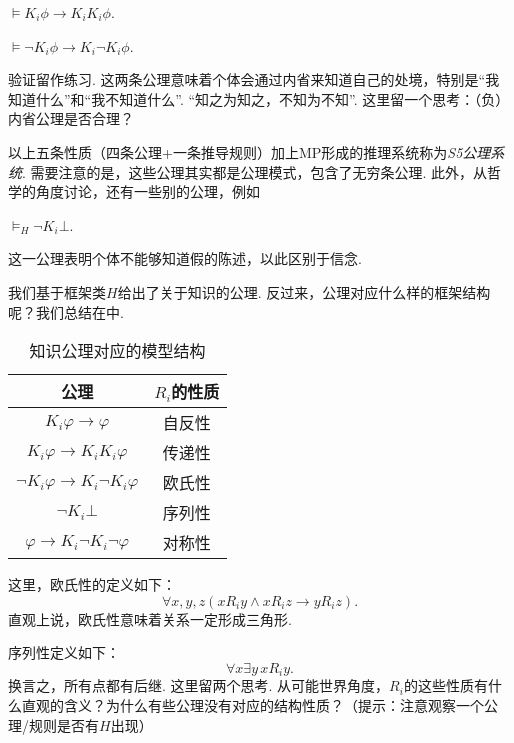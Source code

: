 \begin{axiom}[正内省公理]
    $\vDash K_i\phi\to K_iK_i\phi$.
\end{axiom}

\begin{axiom}[负内省公理]
    $\vDash \neg K_i\phi\to K_i\neg K_i\phi$.
\end{axiom}

验证留作练习.  这两条公理意味着个体会通过内省来知道自己的处境，特别是“我知道什么”和“我不知道什么”. “知之为知之，不知为不知”. 这里留一个思考：（负）内省公理是否合理？

以上五条性质（四条公理+一条推导规则）加上MP形成的推理系统称为\emph{S5公理系统}. 需要注意的是，这些公理其实都是公理模式，包含了无穷条公理. 此外，从哲学的角度讨论，还有一些别的公理，例如
\begin{axiom}[一致性公理]
    $\vDash_H\neg K_i\bot$.
\end{axiom}
这一公理表明个体不能够知道假的陈述，以此区别于信念.

我们基于框架类$H$给出了关于知识的公理. 反过来，公理对应什么样的框架结构呢？我们总结在中.
    \begin{table}[ht]
        \centering
       \begin{tabular}{cc}
\toprule 公理 &  $R_i$的性质 \\
\midrule $K_i \varphi \to \varphi$ & 自反性 \\
$K_i \varphi \to K_i K_i \varphi$ & 传递性 \\
$\neg K_i \varphi \to K_i \neg K_i \varphi$ & 欧氏性 \\
$\neg K_i\bot$  & 序列性\\
$\varphi \to K_i \neg K_i \neg \varphi$ & 对称性 \\
\bottomrule
\end{tabular}
        \caption{知识公理对应的模型结构}
        \label{tab:knowledge-axiom-frame}
    \end{table}

这里，欧氏性的定义如下：
\[\forall x,y,z(xR_iy\wedge xR_iz\to yR_iz).\]
直观上说，欧氏性意味着关系一定形成三角形.

序列性定义如下：
\[\forall x\exists y\, xR_iy.\]
换言之，所有点都有后继. 这里留两个思考. 从可能世界角度，$R_i$的这些性质有什么直观的含义？为什么有些公理没有对应的结构性质？（提示：注意观察一个公理/规则是否有$H$出现）

